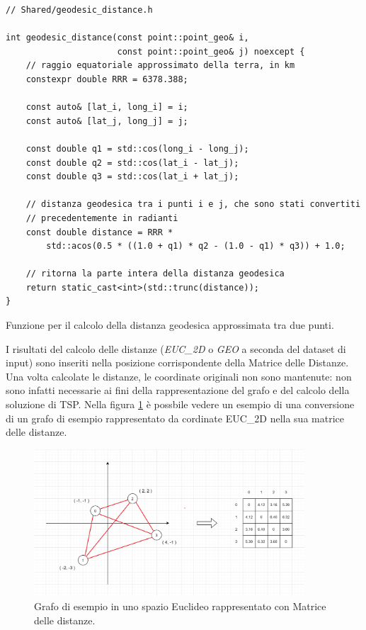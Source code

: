 \begin{listing}[!ht]
\begin{verbatim}
// Shared/geodesic_distance.h

int geodesic_distance(const point::point_geo& i,
                      const point::point_geo& j) noexcept {
    // raggio equatoriale approssimato della terra, in km
    constexpr double RRR = 6378.388;

    const auto& [lat_i, long_i] = i;
    const auto& [lat_j, long_j] = j;

    const double q1 = std::cos(long_i - long_j);
    const double q2 = std::cos(lat_i - lat_j);
    const double q3 = std::cos(lat_i + lat_j);

    // distanza geodesica tra i punti i e j, che sono stati convertiti
    // precedentemente in radianti
    const double distance = RRR *
        std::acos(0.5 * ((1.0 + q1) * q2 - (1.0 - q1) * q3)) + 1.0;

    // ritorna la parte intera della distanza geodesica
    return static_cast<int>(std::trunc(distance));
}
\end{verbatim}
\caption{Funzione per il calcolo della distanza geodesica approssimata tra due punti.}
\label{listing:geodesic-distance}
\end{listing}

\noindent I risultati del calcolo delle distanze (\textit{EUC\_2D} o \textit{GEO} a seconda del dataset di input) sono inseriti nella posizione corrispondente della Matrice delle Distanze.
Una volta calcolate le distanze, le coordinate originali non sono mantenute: non sono infatti necessarie ai fini della rappresentazione del grafo e del calcolo della soluzione di TSP.
Nella figura \ref{fig:distancematrix-example} è possbile vedere un esempio di una conversione di un grafo di esempio rappresentato da cordinate EUC\_2D nella sua matrice delle distanze. \\

\begin{figure}[h]
	\centering
	\includegraphics[width=0.9\textwidth]{./images/Distance Matrix.png}
	\caption{Grafo di esempio in uno spazio Euclideo rappresentato con Matrice delle distanze.}
	\label{fig:distancematrix-example}
\end{figure}

